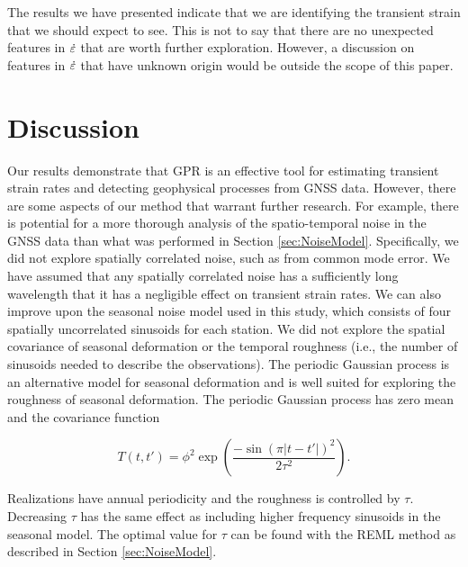 \documentclass[extra,mreferee]{gji}
\begin{document}

The results we have presented indicate that we are identifying the
transient strain that we should expect to see. This is not to say that
there are no unexpected features in $\dot\varepsilon$ that are worth further
exploration. However, a discussion on features in $\dot\varepsilon$ that have
unknown origin would be outside the scope of this paper.

\section{Discussion}\label{sec:Discussion}


Our results demonstrate that GPR is an effective tool for estimating
transient strain rates and detecting geophysical processes from GNSS
data. However, there are some aspects of our method that warrant
further research. For example, there is potential for a more thorough
analysis of the spatio-temporal noise in the GNSS data than what was
performed in Section \ref{sec:NoiseModel}. Specifically, we did not
explore spatially correlated noise, such as from common mode error. We
have assumed that any spatially correlated noise has a sufficiently
long wavelength that it has a negligible effect on transient strain
rates. We can also improve upon the seasonal noise model used in this
study, which consists of four spatially uncorrelated sinusoids for
each station. We did not explore the spatial covariance of seasonal
deformation or the temporal roughness (i.e., the number of sinusoids
needed to describe the observations). The periodic Gaussian process
\citep{Mackay1998} is an alternative model for seasonal deformation
and is well suited for exploring the roughness of seasonal
deformation.  The periodic Gaussian process has zero mean and the
covariance function 

\begin{equation}\label{eq:Periodic}
  T(t,t') = \phi^2 \exp\left(\frac{-\sin(\pi|t - t'|)^2}{2\tau^2}\right). 
\end{equation}

Realizations have annual periodicity and the roughness is controlled
by $\tau$. Decreasing $\tau$ has the same effect as including higher
frequency sinusoids in the seasonal model. The optimal value for
$\tau$ can be found with the REML method as described in Section
\ref{sec:NoiseModel}.
\end{document}
